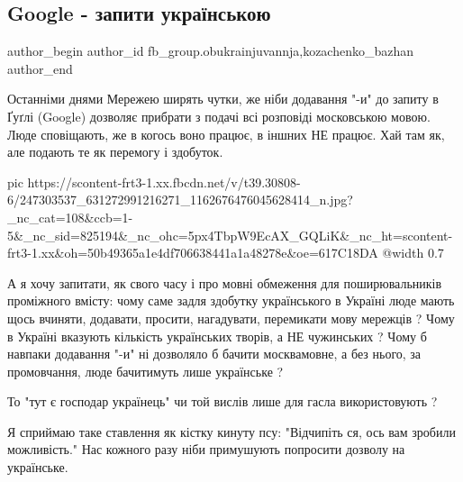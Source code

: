  
 
 
 
 
 
\subsection{Google - запити українською}
\label{sec:24_10_2021.fb.fb_group.obukrainjuvannja.1.google_mova}
 
\ifcmt
 author_begin
   author_id fb_group.obukrainjuvannja,kozachenko_bazhan
 author_end
\fi

Останніми днями Мережею ширять чутки, же ніби додавання "-и" до запиту в Ґуґлі
(Google) дозволяє прибрати з подачі всі розповіді московською мовою. Люде
сповіщають, же в когось воно працює, в іншних НЕ працює. Хай там як, але
подають те як перемогу і здобуток.

\ifcmt
  pic https://scontent-frt3-1.xx.fbcdn.net/v/t39.30808-6/247303537_631272991216271_1162676476045628414_n.jpg?_nc_cat=108&ccb=1-5&_nc_sid=825194&_nc_ohc=5px4TbpW9EcAX_GQLiK&_nc_ht=scontent-frt3-1.xx&oh=50b49365a1e4df706638441a1a48278e&oe=617C18DA
  @width 0.7
\fi

А я хочу запитати, як свого часу і про мовні обмеження для поширювальників
проміжного вмісту: чому саме задля здобутку українського в Україні люде мають
щось вчиняти, додавати, просити, нагадувати, перемикати мову мережців ? Чому в
Україні вказують кількість українських творів, а НЕ чужинських ? Чому б навпаки
додавання "-и" ні дозволяло б бачити москвамовне, а без нього, за промовчання,
люде бачитимуть лише українське ?

То "тут є господар українець" чи той вислів лише для гасла використовують ?

Я сприймаю таке ставлення як кістку кинуту псу: "Відчипіть ся, ось вам зробили
можливість." Нас кожного разу ніби примушують попросити дозволу на українське.

